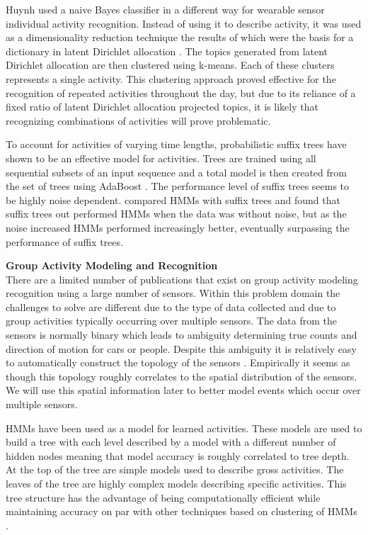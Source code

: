 Huynh \cite{Huynh2008} used a naive Bayes classifier in a different way for wearable sensor individual activity recognition.  Instead of using it to describe activity, it was used as a dimensionality reduction technique the results of which were the basis for a dictionary in latent Dirichlet allocation \cite{Blei2003}.  The topics generated from latent Dirichlet allocation are then clustered using k-means.  Each of these clusters represents a single activity.  This clustering approach proved effective for the recognition of repeated activities throughout the day, but due to its reliance of a fixed ratio of latent Dirichlet allocation projected topics, it is likely that recognizing combinations of activities will prove problematic.

To account for activities of varying time lengths, probabilistic suffix trees \cite{Hamid2007} have shown to be an effective model for activities.  Trees are trained using all sequential subsets of an input sequence and a total model is then created from the set of trees using AdaBoost \cite{Freund1996}.  The performance level of suffix trees seems to be highly noise dependent.  \cite{Hamid2006} compared HMMs with suffix trees and found that suffix trees out performed HMMs when the data was without noise, but as the noise increased HMMs performed increasingly better, eventually surpassing the performance of suffix trees.

\bigskip
\noindent \textbf{Group Activity Modeling and Recognition} \\
There are a limited number of publications that exist on group activity modeling recognition using a large number of sensors.  Within this problem domain the challenges to solve are different due to the type of data collected and due to group activities typically occurring over multiple sensors.  The data from the sensors is normally binary which leads to ambiguity determining true counts and direction of motion for cars or people.  Despite this ambiguity it is relatively easy to automatically construct the topology of the sensors \cite{Wren2003, Wren2006a}.  Empirically it seems as though this topology roughly correlates to the spatial distribution of the sensors.  We will use this spatial information later to better model events which occur over multiple sensors.
	
HMMs have been used as a model for learned activities.  These models are used to build a tree \cite{Minnen2004, Wren2006a} with each level described by a model with a different number of hidden nodes meaning that model accuracy is roughly correlated to tree depth.  At the top of the tree are simple models used to describe gross activities.  The leaves of the tree are highly complex models describing specific activities.  This tree structure has the advantage of being computationally efficient while maintaining accuracy on par with other techniques based on clustering of HMMs \cite{Clarkson1999}.  
	
